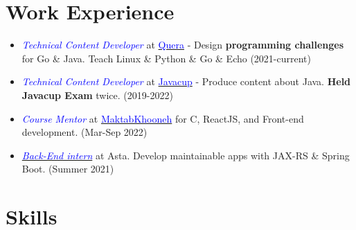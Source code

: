 \documentclass[11pt,a4paper,sans]{moderncv}
\title{}
\begin{document}
\hypersetup{
    linkcolor=blue,
    filecolor=magenta,
    urlcolor=cyan,
}
\noindent
\makecvtitle

\vspace{-0.5em}


\vspace{-0.4em}
\section{Work Experience}
\begin{itemize}


\item \textit{\textcolor{blue}{Technical Content Developer}} at \href{https://quera.org}{\textcolor{blue}{Quera}} - Design \textbf{programming challenges} for Go \& Java. Teach Linux \& Python \& Go \& Echo (2021-current)

\item \textit{\textcolor{blue}{Technical Content Developer}} at {\href{https://javacup.ir}{\textcolor{blue}{Javacup}}} - Produce content about Java. \textbf{Held Javacup Exam} twice. (2019-2022)

\item \textit{\textcolor{blue}{Course Mentor}} at \href{https://maktabkhooneh.org/}{\textcolor{blue}{MaktabKhooneh}} for C, ReactJS, and Front-end development. (Mar-Sep 2022)

\item \textit{{\href{https://asta.ir}{\textcolor{blue}{Back-End intern}}}} at Asta. Develop maintainable apps with JAX-RS \& Spring Boot. (Summer 2021)
\end{itemize}



\vspace{-0.5em}
\section{Skills}


\vspace{-0.4em}
\end{document}
